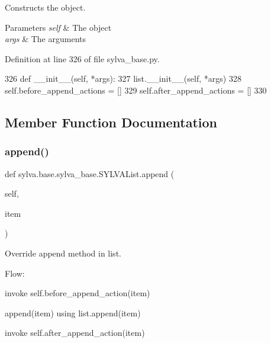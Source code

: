 Constructs the object. 


\begin{DoxyParams}{Parameters}
{\em self} & The object \\
\hline
{\em args} & The arguments \\
\hline
\end{DoxyParams}


Definition at line 326 of file sylva\+\_\+base.\+py.


\begin{DoxyCode}
326     \textcolor{keyword}{def }\_\_init\_\_(self, *args):
327         list.\_\_init\_\_(self, *args)
328         self.before\_append\_actions = []
329         self.after\_append\_actions = []
330 
\end{DoxyCode}


\subsection{Member Function Documentation}
\mbox{\label{classsylva_1_1base_1_1sylva__base_1_1_s_y_l_v_a_list_a7d8693b89ac0a60fa8fc313901db1ad1}} 
\subsubsection{\texorpdfstring{append()}{append()}}
{\footnotesize\ttfamily def sylva.\+base.\+sylva\+\_\+base.\+S\+Y\+L\+V\+A\+List.\+append (\begin{DoxyParamCaption}\item[{}]{self,  }\item[{}]{item }\end{DoxyParamCaption})}



Override append method in list. 

Flow\+:


\begin{DoxyEnumerate}
\item invoke self.\+before\+\_\+append\+\_\+action(item)
\item append(item) using list.\+append(item)
\item invoke self.\+after\+\_\+append\+\_\+action(item)
\end{DoxyEnumerate}



